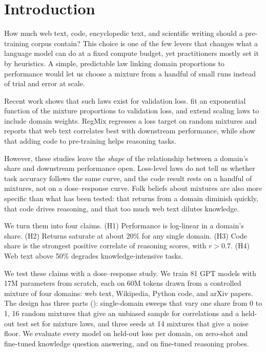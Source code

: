 \section{Introduction}
\label{sec:intro}

How much web text, code, encyclopedic text, and scientific writing should a pre-training corpus contain?
This choice is one of the few levers that changes what a language model can do at a fixed compute budget, yet practitioners mostly set it by heuristics.
A simple, predictable law linking domain proportions to performance would let us choose a mixture from a handful of small runs instead of trial and error at scale.

Recent work shows that such laws exist for validation loss.
\citet{ye2025datamixing} fit an exponential function of the mixture proportions to validation loss, and \citet{shukor2025scaling} extend scaling laws to include domain weights.
RegMix \citep{liu2025regmix} regresses a loss target on random mixtures and reports that web text correlates best with downstream performance, while \citet{aryabumi2025code} show that adding code to pre-training helps reasoning tasks.

However, these studies leave the \emph{shape} of the relationship between a domain's share and downstream performance open.
Loss-level laws do not tell us whether task accuracy follows the same curve, and the code result rests on a handful of mixtures, not on a dose--response curve.
Folk beliefs about mixtures are also more specific than what has been tested: that returns from a domain diminish quickly, that code drives reasoning, and that too much web text dilutes knowledge.

We turn them into four claims.
(H1) Performance is log-linear in a domain's share.
(H2) Returns saturate at about 20\% for any single domain.
(H3) Code share is the strongest positive correlate of reasoning scores, with $r > 0.7$.
(H4) Web text above 50\% degrades knowledge-intensive tasks.

We test these claims with a dose--response study.
We train 81 GPT models with 17M parameters from scratch, each on 60M tokens drawn from a controlled mixture of four domains: web text, Wikipedia, Python code, and arXiv papers.
The design has three parts (): single-domain sweeps that vary one share from 0 to 1, 16 random mixtures that give an unbiased sample for correlations and a held-out test set for mixture laws, and three seeds at 14 mixtures that give a noise floor.
We evaluate every model on held-out loss per domain, on zero-shot and fine-tuned knowledge question answering, and on fine-tuned reasoning probes.

